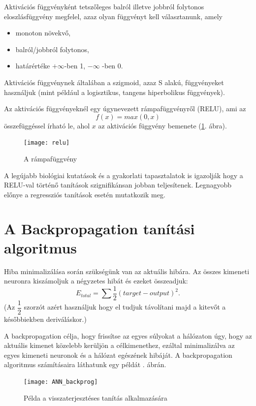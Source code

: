 Aktivációs függvényként tetszőleges balról illetve jobbról folytonos eloszlásfüggvény megfelel, azaz olyan függvényt kell választanunk, amely
\begin{itemize}
\item monoton növekvő,
\item balról/jobbról folytonos,
\item határértéke $+\infty$-ben 1, $-\infty$ -ben 0.
\end{itemize}

Aktivációs függvénynek általában a szigmoid, azaz S alakú, függvényeket használjuk (mint például a logisztikus, tangens hiperbolikus függvények).

Az aktivációs függvényeknél egy úgynevezett rámpafüggvényről (RELU), ami az
$$
f(x) = max(0,x)
$$
összefüggéssel írható le, ahol $x$ az aktivációs függvény bemenete (\ref{fig:relu}. ábra).

\begin{figure}
\centering
\texttt{[image: relu]}
\caption{A rámpafüggvény}
\label{fig:relu}
\end{figure}

A legújabb biológiai kutatások és a gyakorlati tapasztalatok is igazolják hogy a RELU-val történő tanítások szignifikánsan jobban teljesítenek. Legnagyobb előnye a regressziós tanítások esetén mutatkozik meg.

\section{A Backpropagation tanítási algoritmus}

Hiba minimalizálása során szükségünk van az aktuális hibára. Az összes kimeneti neuronra kiszámoljuk a négyzetes hibát és ezeket összeadjuk:
$$
E_{total} = \sum \dfrac{1}{2}(target - output)^2.
$$
(Az $\dfrac{1}{2}$ szorzót azért használjuk hogy el tudjuk távolítani majd a kitevőt a későbbiekben deriváláskor.)

A backpropagation célja, hogy frissítse az egyes súlyokat a hálózaton úgy, hogy az aktuális kimenet közelebb kerüljön a célkimenethez, ezáltal minimalizálva az egyes kimeneti neuronok és a hálózat egészének hibáját. A backpropagation algoritmus számításaira láthatunk egy példát . ábrán.

\begin{figure}
\centering
\texttt{[image: ANN\_backprog]}
\caption{Példa a visszaterjesztéses tanítás alkalmazására}
\label{fig:ANN_backprog}
\end{figure}

